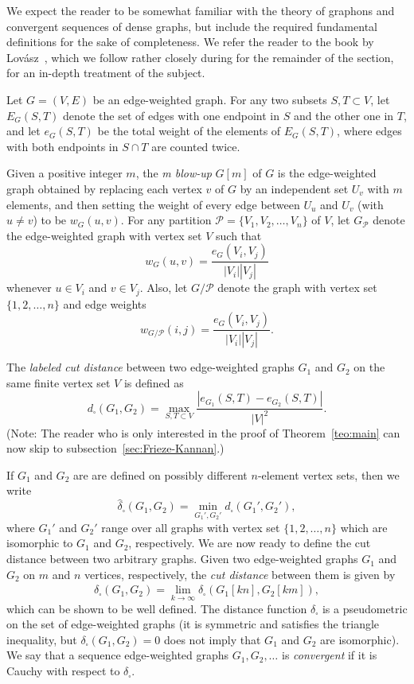 \documentclass{article}
\begin{document}
We expect the reader to be somewhat familiar with the theory of graphons and convergent sequences of dense graphs, but include the required fundamental definitions for the sake of completeness. We refer the reader to the book by Lovász~\cite{lovaszlimits}, which we follow rather closely during for the remainder of the section, for an in-depth treatment of the subject.

Let $G=(V,E)$ be an edge-weighted graph. For any two subsets $S,T\subset V$, let $E_G(S,T)$ denote the set of edges with one endpoint in $S$ and the other one in $T$, and let $e_G(S,T)$ be the total weight of the elements of $E_G(S,T)$, where edges with both endpoints in $S\cap T$ are counted twice. 

Given a positive integer $m$, the \textit{m blow-up} $G[m]$ of $G$ is the edge-weighted graph obtained by replacing each vertex $v$ of $G$ by an independent set $U_v$ with $m$ elements, and then setting the weight of every edge between $U_u$ and $U_v$ (with $u\neq v$) to be $w_G(u,v)$. For any partition $\mathcal{P}=\{V_1,V_2,\dots,V_n\}$ of $V$, let $G_\mathcal{P}$ denote the edge-weighted graph with vertex set $V$ such that \[w_G(u,v)=\frac{e_G(V_i,V_j)}{|V_i||V_j|}\] whenever $u\in V_i$ and $v\in V_j$. Also, let $G/\mathcal{P}$ denote the graph with vertex set $\{1,2,\dots,n\}$ and edge weights \[w_{G/\mathcal{P}}(i,j)=\frac{e_G(V_i,V_j)}{|V_i||V_j|}.\]

The \textit{labeled cut distance} between two edge-weighted graphs $G_1$ and $G_2$ on the same finite vertex set $V$ is defined as \[d_\square(G_1,G_2)=\max_{S,T\subset V}\frac{|e_{G_1}(S,T)-e_{G_2}(S,T)|}{|V|^2}.\](Note: The reader who is only interested in the proof of Theorem~\ref{teo:main} can now skip to subsection~\ref{sec:Frieze-Kannan}.)

If $G_1$ and $G_2$ are are defined on possibly different $n$-element vertex sets, then we write \[\widehat{\delta}_\square(G_1,G_2)=\min_{G_1',G_2'}d_\square(G_1',G_2'),\] where $G_1'$ and $G_2'$ range over all graphs with vertex set $\{1,2,\dots,n\}$ which are isomorphic to $G_1$ and $G_2$, respectively. We are now ready to define the cut distance between two arbitrary graphs. Given two edge-weighted graphs $G_1$ and $G_2$ on $m$ and $n$ vertices, respectively, the \textit{cut distance} between them is given by \[\delta_\square(G_1,G_2)=\lim_{k\rightarrow\infty}\widehat{\delta}_\square(G_1[kn],G_2[km]),\] which can be shown to be well defined. The distance function $\delta_\square$ is a pseudometric on the set of edge-weighted graphs (it is symmetric and satisfies the triangle inequality, but $\delta_\square(G_1,G_2)=0$ does not imply that $G_1$ and $G_2$ are isomorphic). We say that a sequence edge-weighted graphs $G_1,G_2,\dots$ is \textit{convergent} if it is Cauchy with respect to $\delta_\square$. 
\end{document}
